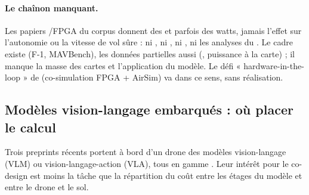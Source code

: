 \paragraph{Le chaînon manquant.} Les papiers /FPGA du corpus donnent des  et
parfois des watts, jamais l'effet sur l'autonomie ou la vitesse de vol sûre : ni
\citet{2025-cali-optimized-implementation-yolov3-tiny-real}, ni
\citet{2025-elhence-fpga-accelerated-yolox-enhanced-attention}, ni
\citet{2024-nguyen-fpga-soc-implementation-yolov4-flying}, ni les analyses du . Le
cadre existe (F-1, MAVBench), les données partielles aussi (, puissance à la carte) ; il
manque la masse des cartes et l'application du modèle. Le défi « hardware-in-the-loop »
de \citet[§IV]{arxiv-2205.07149-robotic-computing-fpgas-current-progress}\pp{} (co-simulation
FPGA + AirSim) va dans ce sens, sans réalisation.

\subsection{Modèles vision-langage embarqués : où placer le calcul}

Trois preprints récents portent à bord d'un drone des modèles vision-langage (VLM) ou
vision-langage-action (VLA), tous en gamme . Leur intérêt pour le co-design est moins
la tâche que la répartition du coût entre les étages du modèle et entre le drone et le
sol.

